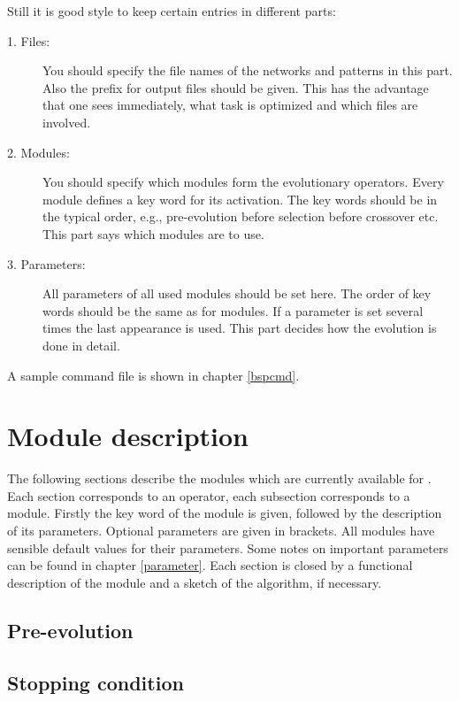 Still it is good style to keep certain entries in different parts: 

\begin{description}

\item[1. Files:]
	You should specify the file names of the networks and patterns in this part.
        Also the prefix for output files should be given.
	This has the advantage that one sees immediately, what task is optimized
     	and which files are involved.

\item[2. Modules:]
	You should specify which modules form the evolutionary operators.
	Every module defines a key word for its activation.
	The key words should be in the typical order, e.g.,
	pre-evolution before selection before crossover etc.
        This part says which modules are to use.
  
\item[3. Parameters:]
	All parameters of all used modules should be set here.
	The order of key words should be the same as for modules.
	If a parameter is set several times the last appearance is used.
	This part  decides how the evolution is done in detail.

\end{description}

A sample command file is shown in chapter \ref{bspcmd}.


\section{Module description\label{modules}}

The following sections describe the modules which are currently available
for \ENZO. Each section corresponds to an operator, each subsection corresponds
to a module. Firstly the key word of the module is given, followed by the description
of its parameters.
Optional parameters are given in brackets.
All modules have sensible default values for their parameters.
Some notes on important parameters can be found in chapter \ref{parameter}.
Each section is closed by a functional description of the module and a sketch
of the algorithm, if necessary.


\subsection{Pre-evolution}       
\subsection{Stopping condition}  
